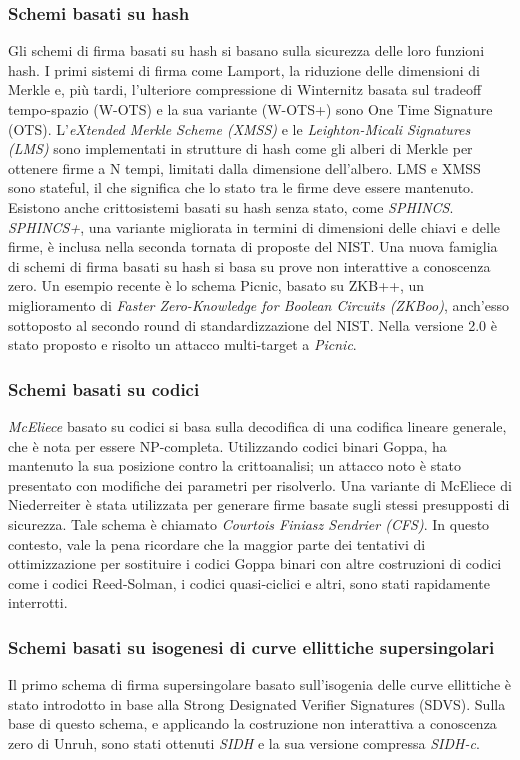 \subsubsection{Schemi basati su hash}
Gli schemi di firma basati su hash si basano sulla sicurezza delle loro funzioni hash. I primi sistemi di firma come Lamport, la riduzione delle dimensioni di Merkle e, più tardi, l'ulteriore compressione di Winternitz basata sul tradeoff tempo-spazio (W-OTS) e la sua variante (W-OTS+) sono One Time Signature (OTS). L'\textit{eXtended Merkle Scheme (XMSS)} e le \textit{Leighton-Micali Signatures (LMS)} sono implementati in strutture di hash come gli alberi di Merkle per ottenere firme a N tempi, limitati dalla dimensione dell'albero. LMS e XMSS sono stateful, il che significa che lo stato tra le firme deve essere mantenuto. Esistono anche crittosistemi basati su hash senza stato, come \textit{SPHINCS}. \textit{SPHINCS+}, una variante migliorata in termini di dimensioni delle chiavi e delle firme, è inclusa nella seconda tornata di proposte del NIST. Una nuova famiglia di schemi di firma basati su hash si basa su prove non interattive a conoscenza zero. Un esempio recente è lo schema Picnic, basato su ZKB++, un miglioramento di \textit{Faster Zero-Knowledge for Boolean Circuits (ZKBoo)}, anch'esso sottoposto al secondo round di standardizzazione del NIST. Nella versione 2.0 è stato proposto e risolto un attacco multi-target a \textit{Picnic}.

\subsubsection{Schemi basati su codici}
\textit{McEliece} basato su codici si basa sulla decodifica di una codifica lineare generale, che è nota per essere NP-completa. Utilizzando codici binari Goppa, ha mantenuto la sua posizione contro la crittoanalisi; un attacco noto è stato presentato con modifiche dei parametri per risolverlo. Una variante di McEliece di Niederreiter è stata utilizzata per generare firme basate sugli stessi presupposti di sicurezza. Tale schema è chiamato \textit{Courtois Finiasz Sendrier (CFS)}. In questo contesto, vale la pena ricordare che la maggior parte dei tentativi di ottimizzazione per sostituire i codici Goppa binari con altre costruzioni di codici come i codici Reed-Solman, i codici quasi-ciclici e altri, sono stati rapidamente interrotti.

\subsubsection{Schemi basati su isogenesi di curve ellittiche supersingolari}
Il primo schema di firma supersingolare basato sull'isogenia delle curve ellittiche è stato introdotto in base alla Strong Designated Verifier Signatures (SDVS). Sulla base di questo schema, e applicando la costruzione non interattiva a conoscenza zero di Unruh, sono stati ottenuti \textit{SIDH} e la sua versione compressa \textit{SIDH-c}.

